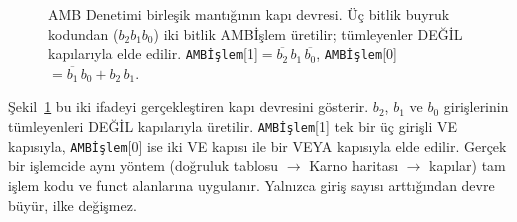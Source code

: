 \begin{figure}[htbp]
\caption[AMB Denetimi birleşik mantığının kapı devresi]{AMB Denetimi birleşik mantığının kapı devresi. Üç bitlik buyruk kodundan ($b_2 b_1 b_0$) iki bitlik AMBİşlem üretilir; tümleyenler DEĞİL kapılarıyla elde edilir. \texttt{AMBİşlem}[1]$=\overline{b_2}\,b_1\,\overline{b_0}$, \texttt{AMBİşlem}[0]$=\overline{b_1}\,b_0+b_2\,b_1$.}
\label{fig:amb-denetimi-devre}
\end{figure}

Şekil~\ref{fig:amb-denetimi-devre} bu iki ifadeyi gerçekleştiren kapı devresini gösterir. $b_2$, $b_1$ ve $b_0$ girişlerinin tümleyenleri DEĞİL kapılarıyla üretilir. \texttt{AMBİşlem}[1] tek bir üç girişli VE kapısıyla, \texttt{AMBİşlem}[0] ise iki VE kapısı ile bir VEYA kapısıyla elde edilir. Gerçek bir işlemcide aynı yöntem (doğruluk tablosu $\rightarrow$ Karno haritası $\rightarrow$ kapılar) tam işlem kodu ve funct alanlarına uygulanır. Yalnızca giriş sayısı arttığından devre büyür, ilke değişmez.

